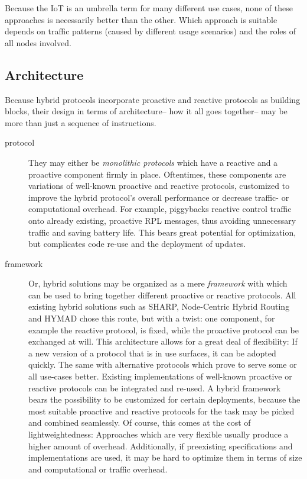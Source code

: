 \documentclass[a4paper,10pt]{scrartcl}
\begin{document}

Because the IoT is an umbrella term for many different use cases, none of these approaches is necessarily better than the other. Which approach is suitable depends on traffic patterns (caused by different usage scenarios) and the roles of all nodes involved.

\subsection{Architecture}
\label{subsec:architecture}
Because hybrid protocols incorporate proactive and reactive protocols as building blocks, their design in terms of architecture-- how it all goes together-- may be more than just a sequence of instructions. 
\begin{description}
\item[protocol] They may either be \emph{monolithic protocols} which have a reactive and a proactive component firmly in place. Oftentimes, these components are variations of well-known proactive and reactive protocols, customized to improve the hybrid protocol's overall performance or decrease traffic- or computational overhead. For example, \cite{baccelli_p2p_rpl} piggybacks reactive control traffic onto already existing, proactive RPL messages, thus avoiding unnecessary traffic and saving battery life. %
This bears great potential for optimization, but complicates code re-use and the deployment of updates.\\
\item[framework] Or, hybrid solutions may be organized as a mere \emph{framework} with which can be used to bring together different proactive or reactive protocols. All existing hybrid solutions such as SHARP, Node-Centric Hybrid Routing and HYMAD chose this route, but with a twist: one component, for example the reactive protocol, is fixed, while the proactive protocol can be exchanged at will. This architecture allows for a great deal of flexibility: If a new version of a protocol that is in use surfaces, it can be adopted quickly. The same with alternative protocols which prove to serve some or all use-cases better. Existing implementations of well-known proactive or reactive protocols can be integrated and re-used.
A hybrid framework bears the possibility to be customized for certain deployments, because the most suitable proactive and reactive protocols for the task may be picked and combined seamlessly.
Of course, this comes at the cost of lightweightedness: Approaches which are very flexible usually produce a higher amount of overhead. Additionally, if preexisting specifications and implementations are used, it may be hard to optimize them in terms of size and computational or traffic overhead.
\end{description}
\end{document}
